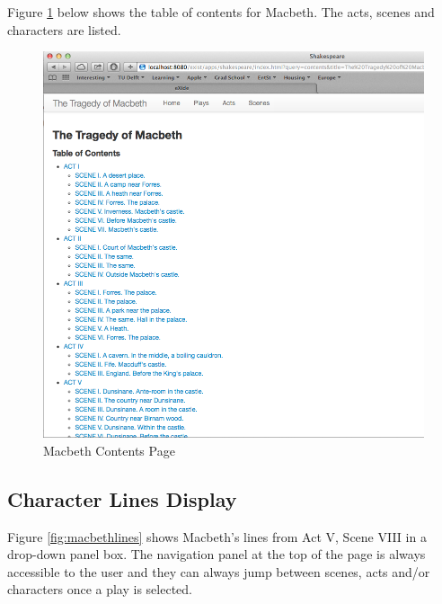 \documentclass[Shakespeare.tex]{subfiles}
\begin{document}
Figure \ref{fig:macbethtoc} below shows the table of contents for Macbeth. The acts, scenes and characters are listed.
\begin{figure} [H]
	\centering
	\includegraphics[width=1\textwidth]{./Figures/MacbethTOC.png}
	\caption{Macbeth Contents Page}
	\label{fig:macbethtoc}
\end{figure}

\subsection{Character Lines Display}
Figure \ref{fig:macbethlines} shows Macbeth's lines from Act V, Scene VIII in a drop-down panel box. The navigation panel at the top of the page is always accessible to the user and they can always jump between scenes, acts and/or characters once a play is selected.
\end{document}
